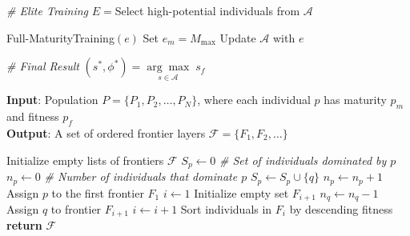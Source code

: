 \documentclass{article}
\begin{document}
\begin{algorithm}
\begin{algorithmic}
            \ENDWHILE

            \item[] \textit{\# Elite Training} \STATE $E =${Select high-potential individuals from }$\mathcal{A}$

             \STATE Full-MaturityTraining$(e)$ \STATE Set
            $e_{m}= M_{\max}$ \STATE Update $\mathcal{A}$ with $e$ \ENDFOR

            \item[] \textit{\# Final Result} \STATE $(s^{*}, \phi^{*}) = \underset
            {s \in \mathcal{A}}{\arg\max}\; s_{f}$
        \end{algorithmic}
    \end{algorithm}
    \clearpage
    \begin{algorithm}
        [H]
        \caption{Maturity-Fitness Non-Dominated Sorting}
        \label{alg:mfnds} \textbf{Input}: Population $P = \{P_{1}, P_{2}, \dots,
        P_{N}\}$, where each individual $p$ has maturity $p_{m}$ and fitness
        $p_{f}$\\
        \textbf{Output}: A set of ordered frontier layers $\mathcal{F}= \{F_{1},
        F_{2}, \dots\}$
        \begin{algorithmic}
            [1] \STATE Initialize empty lists of frontiers $\mathcal{F}$ 
            \STATE $S_{p}\leftarrow0$ \textit{\# Set of individuals dominated by
            $p$} \STATE $n_{p}\leftarrow 0$ \textit{\# Number of individuals
            that dominate $p$}  
            \STATE $S_{p}\leftarrow S_{p}\cup \{q\}$ 
            \STATE $n_{p}\leftarrow n_{p}+ 1$ \ENDIF \ENDFOR {}
            \STATE Assign $p$ to the first frontier $F_{1}$ \ENDIF \ENDFOR
            \STATE $i \leftarrow 1$  \STATE Initialize empty
            set $F_{i+1}$  
            \STATE $n_{q}\leftarrow n_{q}- 1$  \STATE Assign $q$
            to frontier $F_{i+1}$ \ENDIF \ENDFOR \ENDFOR \STATE
            $i \leftarrow i + 1$ \ENDWHILE {} \STATE Sort
            individuals in $F_{i}$ by descending fitness \ENDFOR \STATE \textbf{return}
            $\mathcal{F}$
        \end{algorithmic}
    \end{algorithm}
\end{document}
